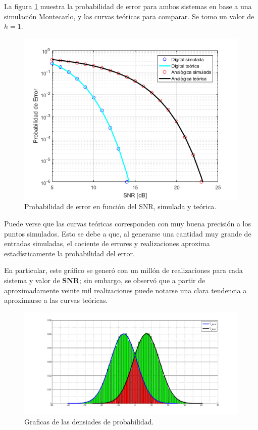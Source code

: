 La figura \ref{fig:mc_h1} muestra la probabilidad de error para ambos sistemas en base a una simulación Montecarlo, y las curvas teóricas para comparar. Se tomo un valor de $h=1$.

\begin{figure}[H]
    \centering
    \includegraphics[width=\textwidth]{./Matlab/ej4h=1n=1meg.png}
    \caption{Probabilidad de error en función del SNR, simulada y teórica. }
\label{fig:mc_h1}
\end{figure}

Puede verse que las curvas teóricas corresponden con muy buena precisión a los puntos simulados. Esto se debe a que, al generarse una cantidad muy grande de entradas simuladas, el cociente de errores y realizaciones aproxima estadísticamente la probabilidad del error.

En particular, este gráfico se generó con un millón de realizaciones para cada sistema y valor de \textbf{SNR}; sin embargo, se observó que a partir de aproximadamente veinte mil realizaciones puede notarse una clara tendencia a aproximarse a las curvas teóricas. 

\begin{figure}[H]
	\centering
	\includegraphics[width=\textwidth]{./Matlab/pdfs}
	\caption{Graficas de las densiades de probabilidad. }
	\label{fig:pdfs}
\end{figure}

